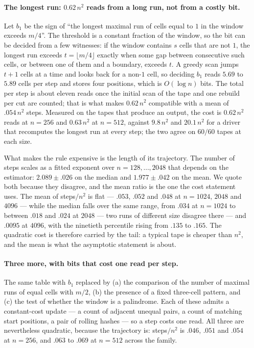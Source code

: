 \documentclass[11pt]{article}
\begin{document}
\paragraph{The longest run: $0.62\,n^2$ reads from a long run, not from a costly bit.} Let $b_1$ be
the sign of ``the longest maximal run of cells equal to $1$ in the window exceeds $m/4$''. The
threshold is a constant fraction of the window, so the bit can be decided from a few witnesses: if
the window contains $s$ cells that are not $1$, the longest run exceeds $t=\lfloor m/4\rfloor$ exactly
when some gap between consecutive such cells, or between one of them and a boundary, exceeds $t$. A
greedy scan jumps $t+1$ cells at a time and looks back for a non-$1$ cell, so deciding $b_1$ reads
$5.69$ to $5.89$ cells per step and stores four positions, which is $O(\log n)$ bits. The total per
step is about eleven reads once the initial scan of the tape and one rebuild per cut are counted;
that is what makes $0.62\,n^2$ compatible with a mean of $.054\,n^2$ steps. Measured on the tapes that
produce an output, the cost is $0.62\,n^2$ reads at $n=256$ and $0.63\,n^2$ at $n=512$, against
$9.8\,n^2$ and $20.1\,n^2$ for a driver that recomputes the longest run at every step; the two agree
on $60/60$ tapes at each size.

What makes the rule expensive is the length of its trajectory. The number of steps scales as
a fitted exponent over $n=128,\dots,2048$ that depends on the estimator: $2.089\pm.026$ on the median
and $1.977\pm.042$ on the mean. We quote both because they disagree, and the mean ratio is the one the
cost statement uses. The mean of steps$/n^2$ is flat --- $.053$, $.052$ and
$.048$ at $n=1024$, $2048$ and $4096$ --- while the median falls over the same range, from $.034$ at $n=1024$ to
between $.018$ and $.024$ at $2048$ --- two runs of different size disagree there --- and $.0095$ at
$4096$, with the ninetieth percentile rising from $.135$ to $.165$. The quadratic cost is
therefore carried by the tail: a typical tape is cheaper than $n^2$, and the mean is what the
asymptotic statement is about.

\paragraph{Three more, with bits that cost one read per step.} The same table with $b_1$ replaced by
(a) the comparison of the number of maximal runs of equal cells with $m/2$, (b) the presence of a
fixed three-cell pattern, and (c) the test of whether the window is a palindrome. Each of these admits
a constant-cost update --- a count of adjacent unequal pairs, a count of matching start positions, a
pair of rolling hashes --- so a step costs one read. All three are nevertheless quadratic, because the
trajectory is: steps$/n^2$ is $.046$, $.051$ and $.054$ at $n=256$, and $.063$ to $.069$ at $n=512$
across the family.
\end{document}

